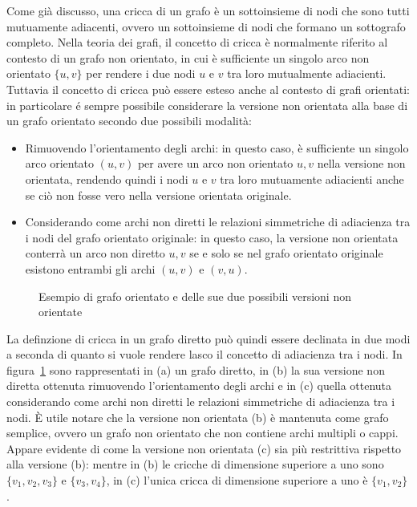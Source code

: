 Come gi\`a discusso, una cricca di un grafo \`e un sottoinsieme di nodi che sono tutti mutuamente
adiacenti, ovvero un sottoinsieme di nodi che formano un sottografo completo.
Nella teoria dei grafi, il concetto di cricca \`e normalmente riferito al contesto di un grafo non orientato,
in cui \`e sufficiente un singolo arco non orientato $\{u, v\}$ per rendere i due nodi $u$ e $v$ tra loro
mutualmente adiacienti.
Tuttavia il concetto di cricca pu\`o essere esteso anche al contesto di grafi orientati: in particolare \'e sempre
possibile considerare la versione non orientata alla base di un grafo orientato secondo due possibili modalit\`a:
\begin{itemize}
    \item Rimuovendo l'orientamento degli archi: in questo caso, \`e sufficiente un singolo arco orientato $(u, v)$
        per avere un arco non orientato ${u, v}$ nella versione non orientata, rendendo quindi i nodi $u$ e $v$ tra loro
        mutuamente adiacienti anche se ci\`o non fosse vero nella versione orientata originale.
    \item Considerando come archi non diretti le relazioni simmetriche di adiacienza tra i nodi del grafo orientato
        originale: in questo caso, la versione non orientata conterr\`a un arco non diretto ${u, v}$ se e solo se
        nel grafo orientato originale esistono entrambi gli archi $(u, v)$ e $(v, u)$.
\end{itemize}

\begin{figure}[H]
    \centering
    
    \caption{Esempio di grafo orientato e delle sue due possibili versioni non orientate}
    \label{fig:undirected_version_example}
\end{figure}

La definzione di cricca in un grafo diretto pu\`o quindi essere declinata in due modi a seconda di quanto si vuole
rendere lasco il concetto di adiacienza tra i nodi.
In figura~\ref{fig:undirected_version_example} sono rappresentati in (a) un grafo diretto, in (b) la sua versione non
diretta ottenuta rimuovendo l'orientamento degli archi e in (c) quella ottenuta considerando come archi non diretti le
relazioni simmetriche di adiacienza tra i nodi. \`E utile notare che la versione non orientata (b) \`e mantenuta come
grafo semplice, ovvero un grafo non orientato che non contiene archi multipli o cappi.
Appare evidente di come la versione non orientata (c) sia pi\`u restrittiva rispetto alla versione (b): mentre
in (b) le cricche di dimensione superiore a uno sono $\{v_1, v_2, v_3\}$ e $\{v_3, v_4\}$, in (c) l'unica
cricca di dimensione superiore a uno \`e $\{v_1, v_2\}$. \newline

